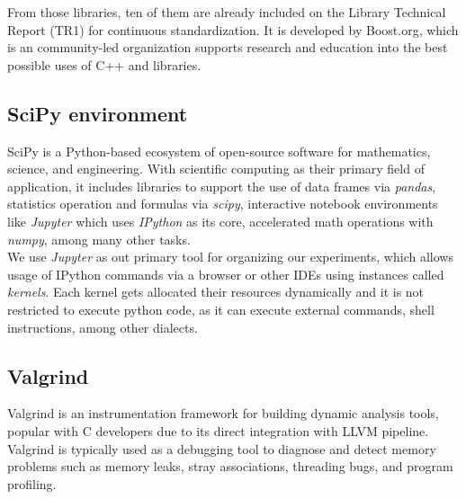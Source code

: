 From those libraries, ten of them are already included on the Library Technical Report (TR1) for continuous standardization. It is developed by Boost.org, which is an community-led organization supports research and education into the best possible uses of C++ and libraries.\\

\subsection{SciPy environment}

SciPy is a Python-based ecosystem of open-source software for mathematics, science, and engineering. With scientific computing as their primary field of application, it includes libraries to support the use of data frames via \textit{pandas}, statistics operation and formulas via \textit{scipy}, interactive notebook environments like \textit{Jupyter} which uses \textit{IPython} as its core, accelerated math operations with \textit{numpy}, among many other tasks. \\

We use \textit{Jupyter} as out primary tool for organizing our experiments, which allows usage of IPython commands via a browser or other IDEs using instances called \textit{kernels}. Each kernel gets allocated their resources dynamically and it is not restricted to execute python code, as it can execute external commands, shell instructions, among other dialects. \\

\subsection{Valgrind}

Valgrind is an instrumentation framework for building dynamic analysis tools, popular with C developers due to its direct integration with LLVM pipeline. Valgrind is typically used as a debugging tool to diagnose and detect memory problems such as memory leaks, stray associations, threading bugs, and program profiling.\\